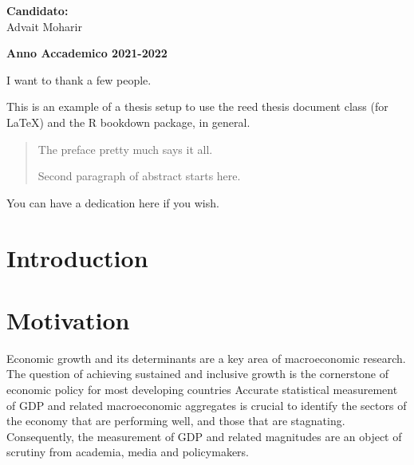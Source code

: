 \documentclass[12pt,nobind, a4paper]{reedthesis}
\begin{document}
	\hfill
	\begin{minipage}[t]{0.47\textwidth}\raggedleft
		{\large{\textbf{Candidato:}\\
				Advait Moharir}}
	\end{minipage}
	\vspace{2mm} %
	\begin{center}
		{\large{\bf Anno Accademico 2021-2022}}
	\end{center}
	\frontmatter %
	\pagestyle{empty} %
		\begin{acknowledgements}
		I want to thank a few people.
	\end{acknowledgements}
		\begin{preface}
		This is an example of a thesis setup to use the reed thesis document class
  (for LaTeX) and the R bookdown package, in general.
	\end{preface}
		\hypersetup{linkcolor=blue}
	\setcounter{secnumdepth}{2}
	\setcounter{tocdepth}{2}
	\tableofcontents
		
		\listoftables
		
		\listoffigures
		\begin{abstract}
		The preface pretty much says it all.

  \par

  Second paragraph of abstract starts here.
	\end{abstract}
		\begin{dedication}
		You can have a dedication here if you wish.
	\end{dedication}
	\mainmatter %
	\pagestyle{fancyplain} %
	
	\hypertarget{introduction}{%
 \chapter*{Introduction}\label{introduction}}

 \hypertarget{mo}{%
 \chapter{Motivation}\label{mo}}

 Economic growth and its determinants are a key area of macroeconomic research. The question of achieving sustained and inclusive growth is the cornerstone of economic policy for most developing countries Accurate statistical measurement of GDP and related macroeconomic aggregates is crucial to identify the sectors of the economy that are performing well, and those that are stagnating. Consequently, the measurement of GDP and related magnitudes are an object of scrutiny from academia, media and policymakers.
 \linebreak
\end{document}
